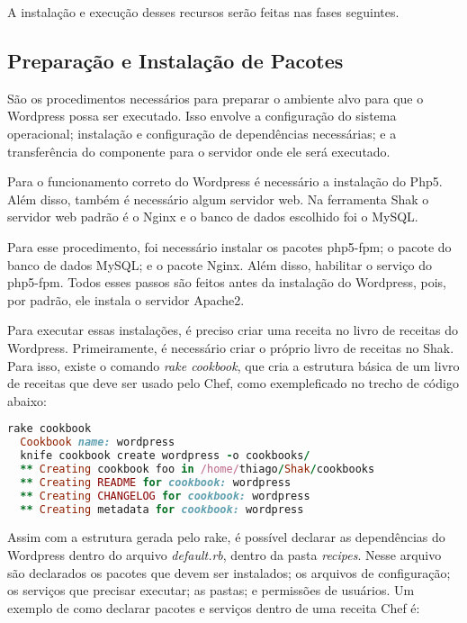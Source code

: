 A instalação e execução desses recursos serão feitas nas fases seguintes.

\subsection{Preparação e Instalação de Pacotes}
\label{wordpress:preparacao}

São os procedimentos necessários para preparar o ambiente alvo para que o Wordpress
possa ser executado. Isso envolve a configuração do sistema operacional; instalação
e configuração de dependências necessárias; e a transferência do componente
para o servidor onde ele será executado.

Para o funcionamento correto do Wordpress é necessário a instalação do Php5. Além
disso, também é necessário algum servidor web. Na ferramenta Shak o servidor
web padrão é o Nginx e o banco de dados escolhido foi o MySQL.

Para esse procedimento, foi necessário instalar os pacotes php5-fpm; o pacote
do banco de dados MySQL; e o pacote Nginx. Além disso, habilitar o serviço do
php5-fpm. Todos esses passos são feitos antes da instalação do Wordpress,
pois, por padrão, ele instala o servidor
Apache2.

Para executar essas instalações, é preciso criar uma receita no livro de receitas
do Wordpress. Primeiramente, é necessário criar o próprio livro de receitas no Shak.
Para isso, existe o comando \textit{rake cookbook}, que cria a estrutura básica
de um livro de receitas que deve ser usado pelo Chef, como exempleficado no trecho
de código abaixo:

\begin{lstlisting}[language=Ruby,label=dice_index,caption={Exemplo de criação de estrutura básica de livro de receitas do wordpress com shak}]
  rake cookbook
  Cookbook name: wordpress
  knife cookbook create wordpress -o cookbooks/
  ** Creating cookbook foo in /home/thiago/Shak/cookbooks
  ** Creating README for cookbook: wordpress
  ** Creating CHANGELOG for cookbook: wordpress
  ** Creating metadata for cookbook: wordpress
\end{lstlisting}

Assim com a estrutura gerada pelo rake, é possível declarar as dependências do Wordpress
dentro do arquivo \textit{default.rb}, dentro da pasta \textit{recipes}. Nesse 
arquivo são declarados os pacotes que devem ser instalados; os arquivos de configuração;
os serviços que precisar executar; as pastas; e permissões de usuários. Um exemplo
de como declarar pacotes e serviços dentro de uma receita Chef é:


